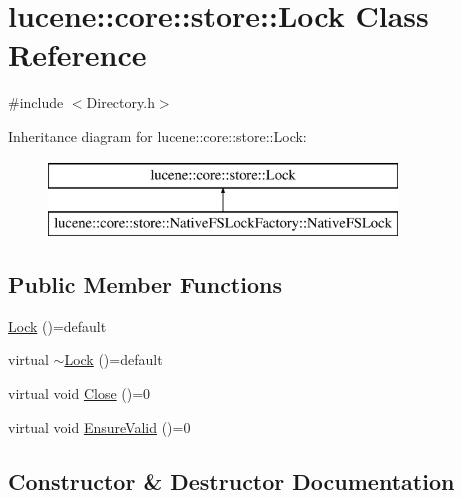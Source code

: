 \hypertarget{classlucene_1_1core_1_1store_1_1Lock}{}\section{lucene\+:\+:core\+:\+:store\+:\+:Lock Class Reference}
\label{classlucene_1_1core_1_1store_1_1Lock}


{\ttfamily \#include $<$Directory.\+h$>$}

Inheritance diagram for lucene\+:\+:core\+:\+:store\+:\+:Lock\+:\begin{figure}[H]
\begin{center}
\leavevmode
\includegraphics[height=2.000000cm]{classlucene_1_1core_1_1store_1_1Lock}
\end{center}
\end{figure}
\subsection*{Public Member Functions}
\begin{DoxyCompactItemize}
\item 
\mbox{\hyperlink{classlucene_1_1core_1_1store_1_1Lock_a91eaf41a31402b178a883a49c287e87d}{Lock}} ()=default
\item 
virtual \mbox{\hyperlink{classlucene_1_1core_1_1store_1_1Lock_aa2563d2b494ac8798eace6909ef4bd77}{$\sim$\+Lock}} ()=default
\item 
virtual void \mbox{\hyperlink{classlucene_1_1core_1_1store_1_1Lock_aef17d7b0b71ded63a0418fb09e524ec9}{Close}} ()=0
\item 
virtual void \mbox{\hyperlink{classlucene_1_1core_1_1store_1_1Lock_ac0bc9440594100dad788e2b8f7e38cfc}{Ensure\+Valid}} ()=0
\end{DoxyCompactItemize}


\subsection{Constructor \& Destructor Documentation}
\mbox{\label{classlucene_1_1core_1_1store_1_1Lock_a91eaf41a31402b178a883a49c287e87d}} 
